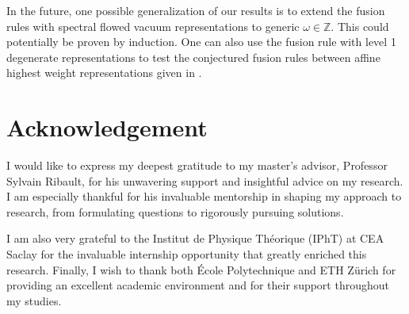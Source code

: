 \documentclass[10pt,a4paper]{article}
\numberwithin{equation}{section}
\begin{document}
In the future, one possible generalization of our results is to extend the fusion rules with spectral flowed vacuum representations 
to generic $\omega \in \mathbb{Z}$. This could potentially be proven by induction. One can also use the fusion rule with level 1 
degenerate representations to test the conjectured fusion rules between affine highest weight representations given in 
\cite{Maldacena:2001km}.

\section*{Acknowledgement}
I would like to express my deepest gratitude to my master’s advisor, Professor Sylvain Ribault, for his unwavering support and insightful 
advice on my research. I am especially thankful for his invaluable mentorship in shaping my approach to research, 
from formulating questions to rigorously pursuing solutions. 

I am also very grateful to the Institut de Physique Théorique (IPhT) at CEA Saclay for the invaluable internship opportunity that 
greatly enriched this research. Finally, I wish to thank both École Polytechnique and ETH Zürich for providing an excellent academic 
environment and for their support throughout my studies.

\printbibliography[heading=bibintoc]
\end{document}
